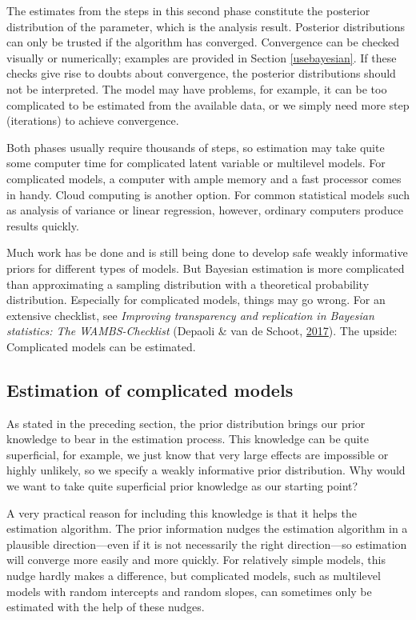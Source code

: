 \documentclass[doc]{apa6}
\begin{document}
The estimates from the steps in this second phase constitute the
posterior distribution of the parameter, which is the analysis result.
Posterior distributions can only be trusted if the algorithm has
converged. Convergence can be checked visually or numerically; examples
are provided in Section \ref{usebayesian}. If these checks give rise to
doubts about convergence, the posterior distributions should not be
interpreted. The model may have problems, for example, it can be too
complicated to be estimated from the available data, or we simply need
more step (iterations) to achieve convergence.

Both phases usually require thousands of steps, so estimation may take
quite some computer time for complicated latent variable or multilevel
models. For complicated models, a computer with ample memory and a fast
processor comes in handy. Cloud computing is another option. For common
statistical models such as analysis of variance or linear regression,
however, ordinary computers produce results quickly.

Much work has be done and is still being done to develop safe weakly
informative priors for different types of models. But Bayesian
estimation is more complicated than approximating a sampling
distribution with a theoretical probability distribution. Especially for
complicated models, things may go wrong. For an extensive checklist, see
\emph{Improving transparency and replication in Bayesian statistics: The
WAMBS-Checklist} (Depaoli \& van de Schoot,
\protect\hyperlink{ref-depaoliImprovingTransparencyReplication2017}{2017}).
The upside: Complicated models can be estimated.

\subsection{Estimation of complicated
models}\label{estimation-of-complicated-models}

As stated in the preceding section, the prior distribution brings our
prior knowledge to bear in the estimation process. This knowledge can be
quite superficial, for example, we just know that very large effects are
impossible or highly unlikely, so we specify a weakly informative prior
distribution. Why would we want to take quite superficial prior
knowledge as our starting point?

A very practical reason for including this knowledge is that it helps
the estimation algorithm. The prior information nudges the estimation
algorithm in a plausible direction---even if it is not necessarily the
right direction---so estimation will converge more easily and more
quickly. For relatively simple models, this nudge hardly makes a
difference, but complicated models, such as multilevel models with
random intercepts and random slopes, can sometimes only be estimated
with the help of these nudges.
\end{document}
